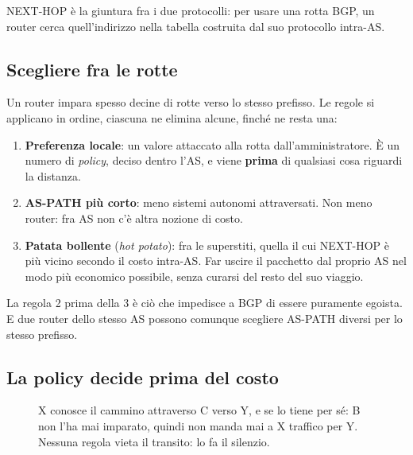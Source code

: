 NEXT-HOP è la giuntura fra i due protocolli: per usare una rotta BGP, un router cerca quell'indirizzo nella tabella costruita dal
suo protocollo intra-AS.

\subsection{Scegliere fra le rotte}

Un router impara spesso decine di rotte verso lo stesso prefisso. Le regole si applicano in ordine, ciascuna ne elimina alcune,
finché ne resta una:
\begin{enumerate}
    \item \textbf{Preferenza locale}: un valore attaccato alla rotta dall'amministratore. È un numero di \emph{policy}, deciso
          dentro l'AS, e viene \textbf{prima} di qualsiasi cosa riguardi la distanza.
    \item \textbf{AS-PATH più corto}: meno sistemi autonomi attraversati. Non meno router: fra AS non c'è altra nozione di costo.
    \item \textbf{Patata bollente} (\emph{hot potato}): fra le superstiti, quella il cui NEXT-HOP è più vicino secondo il costo
          intra-AS. Far uscire il pacchetto dal proprio AS nel modo più economico possibile, senza curarsi del resto del suo
          viaggio.
\end{enumerate}
La regola 2 prima della 3 è ciò che impedisce a BGP di essere puramente egoista. E due router dello stesso AS possono comunque
scegliere AS-PATH diversi per lo stesso prefisso.

\subsection{La policy decide prima del costo}

\begin{figure}[H]
\centering
{}
\caption{X conosce il cammino attraverso C verso Y, e se lo tiene per sé: B non l'ha mai imparato, quindi non manda mai a X traffico
         per Y. Nessuna regola vieta il transito: lo fa il silenzio.}
\end{figure}


